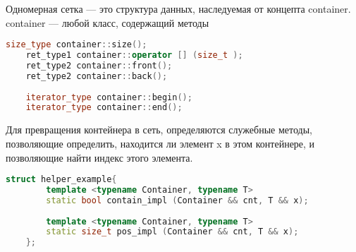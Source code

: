 Одномерная сетка --- это структура данных, наследуемая от концепта container. container --- любой класс, содержащий методы
\begin{lstlisting}[language = c++]
	size_type container::size();
	ret_type1 container::operator [] (size_t );
	ret_type2 container::front();
	ret_type2 container::back();
	
	iterator_type container::begin();
	iterator_type container::end();
\end{lstlisting}

Для превращения контейнера в сеть, определяются служебные методы, позволяющие определить, находится ли элемент x в этом контейнере, и позволяющие найти индекс этого элемента.


\begin{lstlisting}[language = c++]
	struct helper_example{
		template <typename Container, typename T>
		static bool contain_impl (Container && cnt, T && x);
		
		template <typename Container, typename T>
		static size_t pos_impl (Container && cnt, T && x);
	};
\end{lstlisting}

